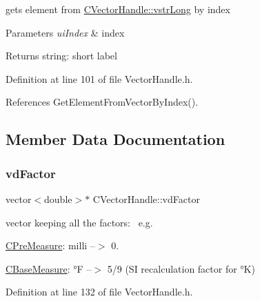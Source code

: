 gets element from \hyperlink{classCVectorHandle_a71bec0e385b9ca8e5ffa174b559da9f8}{C\+Vector\+Handle\+::vstr\+Long} by index 


\begin{DoxyParams}{Parameters}
{\em ui\+Index} & index \\
\hline
\end{DoxyParams}
\begin{DoxyReturn}{Returns}
string\+: short label 
\end{DoxyReturn}


Definition at line 101 of file Vector\+Handle.\+h.



References Get\+Element\+From\+Vector\+By\+Index().



\subsection{Member Data Documentation}
\mbox{\label{classCVectorHandle_af8f8b2e0da8363e695872ca85f33364e}} 
\subsubsection{\texorpdfstring{vd\+Factor}{vdFactor}}
{\footnotesize\ttfamily vector$<$double$>$$\ast$ C\+Vector\+Handle\+::vd\+Factor\hspace{0.3cm}{\ttfamily [protected]}}



vector keeping all the factors\+:~\newline
 e.\+g. 


\begin{DoxyItemize}
\item \hyperlink{classCPreMeasure}{C\+Pre\+Measure}\+: milli --$>$ 0.
\item \hyperlink{classCBaseMeasure}{C\+Base\+Measure}\+: °F --$>$ 5/9 (SI recalculation factor for °K) 
\end{DoxyItemize}

Definition at line 132 of file Vector\+Handle.\+h.

\mbox{\label{classCVectorHandle_a71bec0e385b9ca8e5ffa174b559da9f8}} 
